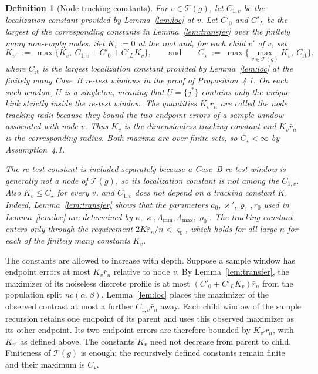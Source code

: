 \documentclass[12pt, a4paper]{article}
\newtheorem{defin}{Definition}[section]
\newcommand{\assterm}{Assumption~4.1}
\newcommand{\proppop}{Proposition~4.1}
\begin{document}
\begin{defin}[Node tracking constants]
\label{def:radii}
For $v\in\mathcal T(g)$, let $C_{1,v}$ be the localization constant provided
by Lemma~\ref{lem:loc} at $v$. Let $C'_0$ and $C'_L$ be the largest of the
corresponding constants in Lemma~\ref{lem:transfer} over the finitely many
non-empty nodes. Set $K_v:=0$ at the root and, for each child $v'$ of $v$, set
\[
K_{v'} \;:=\; \max\big\{ K_v, \ C_{1,v} + C'_0 + C'_L K_v \big\} ,
\qquad\text{and}\qquad
C_\star \;:=\; \max\Big\{ \max_{v \in \mathcal{T}(g)} K_v, \ C_{\mathrm{rt}} \Big\} ,
\]
where $C_{\mathrm{rt}}$ is the largest localization constant provided by
Lemma~\ref{lem:loc} at the finitely many Case~B re-test windows in the proof of
\proppop{}. On each such window, $U$ is a singleton, meaning that
$U=\{j^*\}$ contains only the unique kink strictly inside the re-test window.
The quantities $K_v\bar r_n$ are called the node tracking radii because they
bound the two endpoint errors of a sample window associated with node $v$.
Thus $K_v$ is the dimensionless tracking constant and $K_v\bar r_n$ is the
corresponding radius. Both maxima are over finite sets, so
$C_\star<\infty$ by \assterm{}.

The re-test constant is included separately because a Case~B re-test window is
generally not a node of $\mathcal T(g)$, so its localization constant is not
among the $C_{1,v}$. Also $K_v\le C_\star$ for every $v$, and $C_{1,v}$ does
not depend on a tracking constant $K$. Indeed, Lemma~\ref{lem:transfer} shows
that the parameters $a_0,\varkappa',\varrho_1,r_0$ used in
Lemma~\ref{lem:loc} are determined by
$\kappa,\varkappa,\Lambda_{\min},\Lambda_{\max},\varrho_0$. The tracking
constant enters only through the requirement
$2K\bar r_n/n<\varsigma_0$, which holds for all large $n$ for each of the
finitely many constants $K_v$.
\end{defin}

The constants are allowed to increase with depth. Suppose a sample window has
endpoint errors at most $K_v\bar r_n$ relative to node $v$. By
Lemma~\ref{lem:transfer}, the maximizer of its noiseless discrete profile is at
most $(C'_0+C'_LK_v)\bar r_n$ from the population split
$n c(\alpha,\beta)$. Lemma~\ref{lem:loc} places the maximizer of the observed
contrast at most a further $C_{1,v}\bar r_n$ away. Each child window of the
sample recursion retains one endpoint of its parent and uses this observed
maximizer as its other endpoint. Its two endpoint errors are therefore bounded
by $K_{v'}\bar r_n$, with $K_{v'}$ as defined above. The constants $K_v$ need
not decrease from parent to child. Finiteness of $\mathcal T(g)$ is enough:
the recursively defined constants remain finite and their maximum is
$C_\star$.
\end{document}
